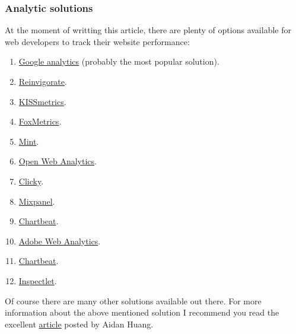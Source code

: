 \documentclass[letterpaper,10pt,english]{sphinxmanual}
\begin{document}
\subsubsection{Analytic solutions}
\label{features/components/tracking_codes/tracking_codes:analytic-solutions}
At the moment of writting this article, there are plenty of options available for web developers to track their
website performance:
\begin{enumerate}
\item {} 
\href{https://www.google.com/analytics/}{Google analytics} (probably the most popular solution).

\item {} 
\href{https://www.reinvigorate.net/}{Reinvigorate}.

\item {} 
\href{https://www.kissmetrics.com/}{KISSmetrics}.

\item {} 
\href{http://foxmetrics.com/}{FoxMetrics}.

\item {} 
\href{http://haveamint.com/}{Mint}.

\item {} 
\href{http://www.openwebanalytics.com/}{Open Web Analytics}.

\item {} 
\href{http://clicky.com/}{Clicky}.

\item {} 
\href{https://mixpanel.com/}{Mixpanel}.

\item {} 
\href{https://chartbeat.com/}{Chartbeat}.

\item {} 
\href{http://www.adobe.com/solutions/digital-analytics.html}{Adobe Web Analytics}.

\item {} 
\href{https://chartbeat.com/}{Chartbeat}.

\item {} 
\href{http://www.inspectlet.com/}{Inspectlet}.

\end{enumerate}

Of course there are many other solutions available out there. For more information about the above mentioned solution I recommend
you read the excellent \href{http://www.onextrapixel.com/2013/07/16/ten-best-alternatives-to-google-analytics/}{article}
posted by Aidan Huang.
\end{document}
